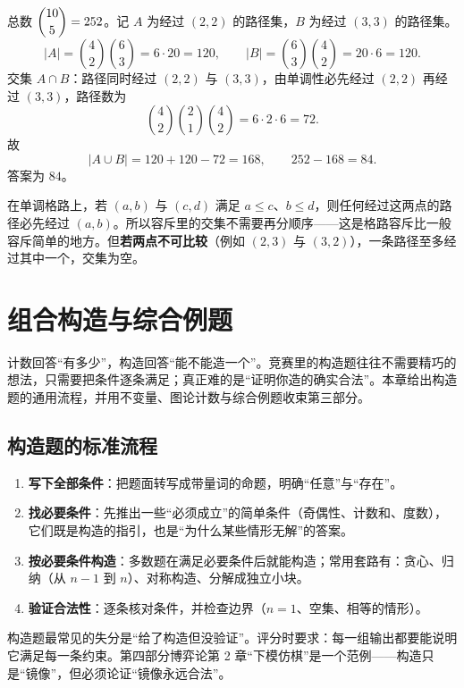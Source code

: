 \sol 总数 $\dbinom{10}5=252$。记 $A$ 为经过 $(2,2)$ 的路径集，$B$ 为经过 $(3,3)$ 的路径集。
\[
|A|=\binom42\binom{6}{3}=6\cdot20=120,\qquad
|B|=\binom63\binom42=20\cdot6=120.
\]
交集 $A\cap B$：路径同时经过 $(2,2)$ 与 $(3,3)$，由单调性必先经过 $(2,2)$ 再经过 $(3,3)$，路径数为
\[
\binom42\binom21\binom42=6\cdot2\cdot6=72.
\]
故
\[
|A\cup B|=120+120-72=168,\qquad 252-168=84.
\]
答案为 $84$。

\begin{pitfall}[单调性给出禁入点的天然顺序]
在单调格路上，若 $(a,b)$ 与 $(c,d)$ 满足 $a\le c$、$b\le d$，则任何经过这两点的路径必先经过 $(a,b)$。所以容斥里的交集不需要再分顺序——这是格路容斥比一般容斥简单的地方。但\textbf{若两点不可比较}（例如 $(2,3)$ 与 $(3,2)$），一条路径至多经过其中一个，交集为空。
\end{pitfall}

\chapter{组合构造与综合例题}
\begin{chapterintro}[章节导读]
计数回答“有多少”，构造回答“能不能造一个”。竞赛里的构造题往往不需要精巧的想法，只需要把条件逐条满足；真正难的是“证明你造的确实合法”。本章给出构造题的通用流程，并用不变量、图论计数与综合例题收束第三部分。
\end{chapterintro}

\section{构造题的标准流程}
\begin{enumerate}
\item \textbf{写下全部条件}：把题面转写成带量词的命题，明确“任意”与“存在”。
\item \textbf{找必要条件}：先推出一些“必须成立”的简单条件（奇偶性、计数和、度数），它们既是构造的指引，也是“为什么某些情形无解”的答案。
\item \textbf{按必要条件构造}：多数题在满足必要条件后就能构造；常用套路有：贪心、归纳（从 $n-1$ 到 $n$）、对称构造、分解成独立小块。
\item \textbf{验证合法性}：逐条核对条件，并检查边界（$n=1$、空集、相等的情形）。
\end{enumerate}

\begin{pitfall}
构造题最常见的失分是“给了构造但没验证”。评分时要求：每一组输出都要能说明它满足每一条约束。第四部分博弈论第 2 章“下模仿棋”是一个范例——构造只是“镜像”，但必须论证“镜像永远合法”。
\end{pitfall}

